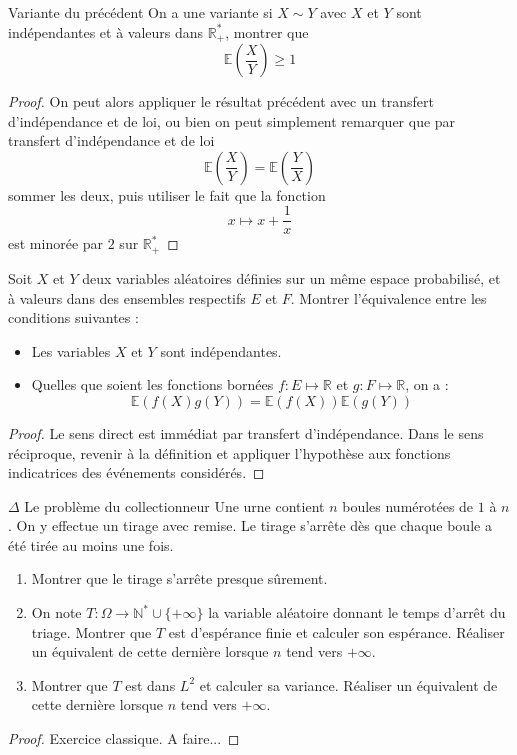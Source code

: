 \documentclass[french,a4paper]{article}
\newcommand{\N}{\mathbb{N}}
\newcommand{\R}{\mathbb{R}}
\newcommand{\st}{^*}
\newcommand{\E}{\mathbb{E}}
\theoremstyle{plain}
\theoremstyle{definition}
\theoremstyle{remark}
\begin{document}
\begin{ex}[Moulin.50]{Variante du précédent}
	On a une variante si $X\sim Y$ avec $X$ et $Y$ sont indépendantes et à valeurs dans $\R_+\st$, montrer que $$\E\left(\frac{X}{Y}\right)\geqslant1$$
\end{ex}
\begin{proof}
	On peut alors appliquer le résultat précédent avec un transfert d'indépendance et de loi, ou bien on peut simplement remarquer que par transfert d'indépendance et de loi $$\E\left(\frac{X}{Y}\right)=\E\left(\frac{Y}{X}\right)$$ sommer les deux, puis utiliser le fait que la fonction $$x\mapsto x+\frac{1}{x}$$ est minorée par $2$ sur $\R_+\st$
\end{proof}

\begin{ex}[Moulin.51]{}
	Soit $X$ et $Y$ deux variables aléatoires définies sur un même espace probabilisé, et à valeurs dans des ensembles respectifs $E$ et $F$. Montrer l'équivalence entre les conditions suivantes :
	\begin{itemize}
		\item Les variables $X$ et $Y$ sont indépendantes.
		\item Quelles que soient les fonctions bornées $f:E\mapsto \R$ et $g:F\mapsto\R$, on a : $$\E(f(X)g(Y))=\E(f(X))\E(g(Y))$$
	\end{itemize}
\end{ex}
\begin{proof}
	Le sens direct est immédiat par transfert d'indépendance. Dans le sens réciproque, revenir à la définition et appliquer l'hypothèse aux fonctions indicatrices des événements considérés.
\end{proof}

\begin{ex}[Moulin.52]{$\Delta$ Le problème du collectionneur}
	Une urne contient $n$ boules numérotées de $1$ à $n$. On y effectue un tirage avec remise. Le tirage s'arrête dès que chaque boule a été tirée au moins une fois.
	\begin{enumerate}
		\item Montrer que le tirage s'arrête presque sûrement.
		\item On note $T:\Omega\to\N\st\cup\{+\infty\}$ la variable aléatoire donnant le temps d'arrêt du triage. Montrer que $T$ est d'espérance finie et calculer son espérance. Réaliser un équivalent de cette dernière lorsque $n$ tend vers $+\infty$.
		\item Montrer que $T$ est dans $L^2$ et calculer sa variance. Réaliser un équivalent de cette dernière lorsque $n$ tend vers $+\infty$.
	\end{enumerate}
\end{ex}
\begin{proof}
	Exercice classique. A faire...
\end{proof}
\end{document}
